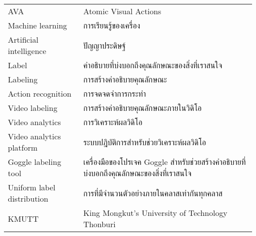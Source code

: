 \begin{abbreviations}
    \noindent
    \begin{tabular*}{\textwidth}{@{}p{}p{}@{}}
        {AVA} & {Atomic Visual Actions} \\
        {Machine learning} & {การเรียนรู้ของเครื่อง} \\
        {Artificial intelligence} & {ปัญญาประดิษฐ์} \\
        {Label} & {คำอธิบายที่บ่งบอกถึงคุณลักษณะของสิ่งที่เราสนใจ} \\
        {Labeling} & {การสร้างคำอธิบายคุณลักษณะ} \\
        {Action recognition} & {การจดจดจำการกระทำ} \\
        {Video labeling} & {การสร้างคำอธิบายคุณลักษณะภายในวิดิโอ} \\
        {Video analytics} & {การวิเคราะห์ผลวิดิโอ} \\
	{Video analytics platform} & {ระบบปฎิบัติการสำหรับช่วยวิเคราะห์ผลวิดิโอ} \\
        {Goggle labeling tool} & {เครื่องมือของโปรเจค Goggle สำหรับช่วยสร้างคำอธิบายที่บ่งบอกถึงคุณลักษณะของสิ่งที่เราสนใจ} \\
        {Uniform label distribution} & {การที่มีจำนวนตัวอย่างภายในคลาสเท่ากันทุกคลาส} \\
        {KMUTT} & {King Mongkut's University of Technology Thonburi} \\
    \end{tabular*}
\end{abbreviations}
